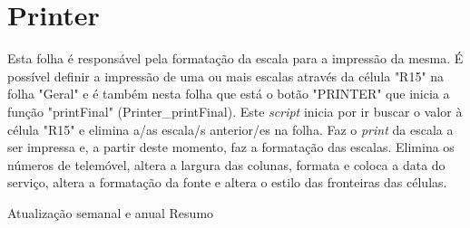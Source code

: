 \graphicspath{{Images/}}

\section{Printer}
\label{Pré-impressão}
Esta folha é responsável pela formatação da escala para a impressão da mesma. É possível definir a impressão de uma ou mais escalas através da célula "R15" na folha "Geral" e é também nesta folha que está o botão "PRINTER" que inicia a função "printFinal" (Printer\_printFinal). Este \textit{script} inicia por ir buscar o valor à célula "R15" e elimina a/as escala/s anterior/es na folha. Faz o \textit{print} da escala a ser impressa e, a partir deste momento, faz a formatação das escalas. Elimina os números de telemóvel, altera a largura das colunas, formata e coloca a data do serviço, altera a formatação da fonte e altera o estilo das fronteiras das células.

Atualização semanal e anual
Resumo
